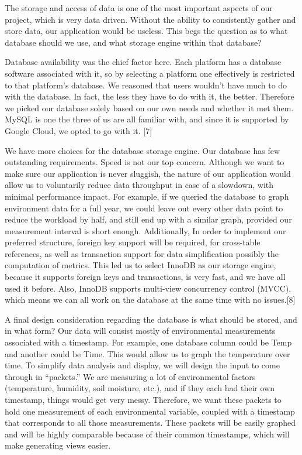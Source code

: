 \documentclass[IEEEtran,letterpaper,10pt,titlepage,fleqn,draftclsnofoot,onecolumn]{article}
\begin{document}
The storage and access of data is one of the most important aspects of our project, which is very data driven. Without the ability to consistently gather and store data, our application would be useless. This begs the question as to what database should we use, and what storage engine within that database? 

Database availability was the chief factor here. Each platform has a database software associated with it, so by selecting a platform one effectively is restricted to that platform’s database. We reasoned that users wouldn’t have much to do with the database. In fact, the less they have to do with it, the better. Therefore we picked our database solely based on our own needs and whether it met them. MySQL is one the three of us are all familiar with, and since it is supported by Google Cloud, we opted to go with it. [7]

We have more choices for the database storage engine. Our database has few outstanding requirements. Speed is not our top concern. Although we want to make sure our application is never sluggish, the nature of our application would allow us to voluntarily reduce data throughput in case of a slowdown, with minimal performance impact. For example, if we queried the database to graph environment data for a full year, we could leave out every other data point to reduce the workload by half, and still end up with a similar graph, provided our measurement interval is short enough. Additionally, In order to implement our preferred structure, foreign key support will be required, for cross-table references, as well as transaction support for data simplification possibly the computation of metrics. This led us to select InnoDB as our storage engine, because it supports foreign keys and transactions, is very fast, and we have all used it before. Also, InnoDB supports multi-view concurrency control (MVCC), which means we can all work on the database at the same time with no issues.[8]

A final design consideration regarding the database is what should be stored, and in what form? Our data will consist mostly of environmental measurements associated with a timestamp. For example, one database column could be Temp and another could be Time. This would allow us to graph the temperature over time. To simplify data analysis and display, we will design the input to come through in “packets.” We are measuring a lot of environmental factors (temperature, humidity, soil moisture, etc.), and if they each had their own timestamp, things would get very messy. Therefore, we want these packets to hold one measurement of each environmental variable, coupled with a timestamp that corresponds to all those measurements. These packets will be easily graphed and will be highly comparable because of their common timestamps, which will make generating views easier.
\end{document}
